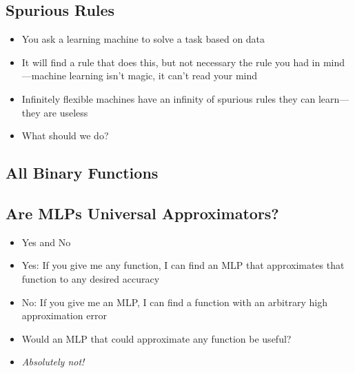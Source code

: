 
\begin{slide}
\section{Spurious Rules}

\begin{PauseHighLight}
  \begin{itemize}
  \item You ask a learning machine to solve a task based on data\pause
  \item It will find a rule that does this, but not necessary the rule
    you had in mind\pause---machine learning isn't magic, it can't
    read your mind\pauseb
  \item Infinitely flexible machines have an infinity of spurious
    rules they can learn\pause---they are useless\pauseb
  \item What should we do?\pause
  \end{itemize}
\end{PauseHighLight}

\end{slide}


\begin{slide}
\section[-2]{All Binary Functions}

\pb \pause {}
\begin{center}
  \pause
\end{center}
\end{slide}


\begin{slide}
\section{Are MLPs Universal Approximators?}

\begin{PauseHighLight}
  \begin{itemize}
  \item Yes\pauseb{} and No\pauseb
  \item Yes: If you give me any function, I can find an MLP that
    approximates that function to any desired accuracy\pauseb
  \item No: If you give me an MLP, I can find a function with an
    arbitrary high approximation error\pauseb
  \item Would an MLP that could approximate any function be
    useful?\pauseb
  \item \emph{Absolutely not!}\pauseb
  \end{itemize}
\end{PauseHighLight}

\end{slide}



